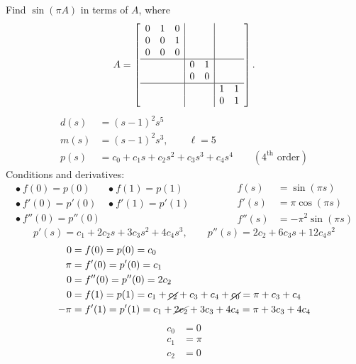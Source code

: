 \begin{example}
Find $\sin(\pi A)$ in terms of $A$, where
\[
A = \left[\begin{array}{ccc|cc|cc}
0&1&0 & & & & \\
0&0&1 & & & & \\
0&0&0 & & & & \\ \hline
 & & & 0&1 & & \\
 & & & 0&0 & & \\ \hline
 & & & & & 1&1\\
 & & & & & 0&1
\end{array}\right].
\]
\begin{align*}
d(s) &= (s-1)^2 s^5\\
m(s) &= (s-1)^2 s^3, \qquad \ell = 5\\
p(s) &= c_0 + c_1s + c_2s^2 + c_3s^3 + c_4s^4 \qquad (4^{\text{th}}\text{ order})
\end{align*}
Conditions and derivatives:
\[
\begin{array}{ll}
\bullet\ f(0) = p(0) & \bullet\ f(1) = p(1)\\
\bullet\ f'(0) = p'(0) & \bullet\ f'(1) = p'(1)\\
\bullet\ f''(0) = p''(0) &
\end{array}
\qquad\qquad
\begin{aligned}
f(s) &= \sin(\pi s)\\
f'(s) &= \pi\cos(\pi s)\\
f''(s) &= -\pi^2\sin(\pi s)
\end{aligned}
\]
\[
p'(s) = c_1 + 2c_2s + 3c_3s^2 + 4c_4s^3, \qquad
p''(s) = 2c_2 + 6c_3s + 12c_4s^2
\]
\begin{align*}
0 &= f(0) = p(0) = c_0\\
\pi &= f'(0) = p'(0) = c_1\\
0 &= f''(0) = p''(0) = 2c_2\\
0 &= f(1) = p(1) = c_1 + \cancel{c_2} + c_3 + c_4 + \cancel{c_0} = \pi + c_3 + c_4\\
-\pi &= f'(1) = p'(1) = c_1 + \cancel{2c_2} + 3c_3 + 4c_4 = \pi + 3c_3 + 4c_4
\end{align*}
\[
\boxed{\begin{aligned} c_0 &= 0\\ c_1 &= \pi\\ c_2 &= 0\end{aligned}}
\]
\end{example}

